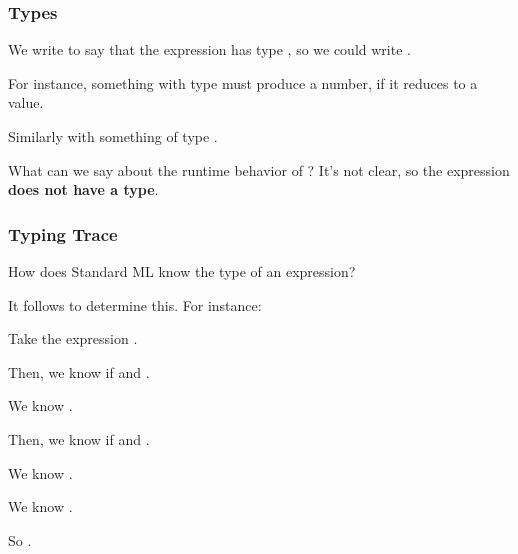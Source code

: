 \documentclass[aspectratio=169]{beamer}
\begin{document}
\begin{frame}[plain]
  \frametitle{Types}


  \pause
  \vspace{5pt}

  We write  to say that the expression  has type , so 
  we could write .

  \pause
  \vspace{\fill}

  For instance, something with type  must produce a number, if it reduces to a value.

  \vspace{5pt}

  Similarly with something of type .

  \pause
  \vspace{\fill}

  What can we say about the runtime behavior of ? It's not clear, so 
  the expression  \textbf{does not have a type}.
\end{frame}

\begin{frame}[plain]
  \frametitle{Typing Trace}

  How does Standard ML know the type of an expression?

  \vspace{5pt}

  It follows  to determine this. For instance: 

  \pause
  \vspace{\fill}
  

  \pause
  \vspace{\fill}

  Take the expression .

  \pause
  \vspace{\fill}

  Then, we know  if  and .
  \pause
  \vspace{3pt}

  We know .
  \pause
  \vspace{3pt}

  Then, we know  if  and .
  \pause
  \vspace{3pt}

  We know .
  \pause
  \vspace{3pt}

  We know .
  \pause
  \vspace{3pt}

  So .
\end{frame}
\end{document}
